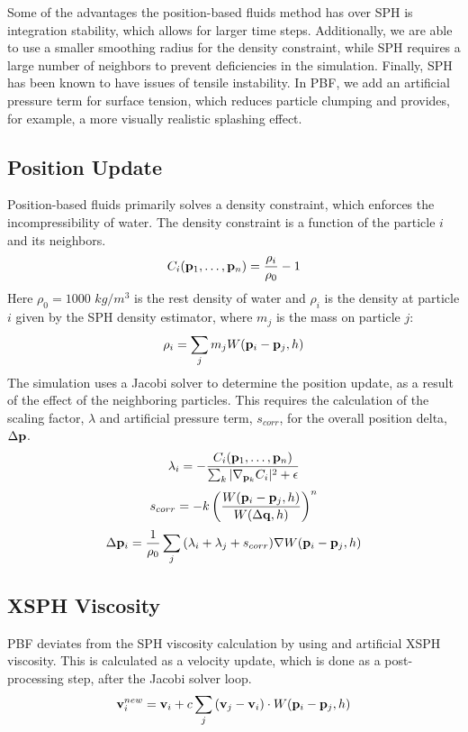 \documentclass[conference]{IEEEtran}
\begin{document}
Some of the advantages the position-based fluids method has over SPH is integration stability, which allows for larger time steps. Additionally, we are able to use a smaller smoothing radius for the density constraint, while SPH requires a large number of neighbors to prevent deficiencies in the simulation. Finally, SPH has been known to have issues of tensile instability. In PBF, we add an artificial pressure term for surface tension, which reduces particle clumping and provides, for example, a more visually realistic splashing effect. 
\subsection*{Position Update}
Position-based fluids primarily solves a density constraint, which enforces the incompressibility of water. The density constraint is a function of the particle $i$ and its neighbors. 
\begin{equation*} 
C_i(\bold p_1, \dots, \bold p_n) = \frac{\rho_i}{\rho_0} - 1
\end{equation*}
Here $\rho_0 = 1000$ $kg/m^3$ is the rest density of water and $\rho_i$ is the density at particle $i$ given by the SPH density estimator, where $m_j$ is the mass on particle $j$:
\begin{equation*} 
\rho_i = \sum_{j}{m_j W(\bold p_i-\bold p_j,h)}
\end{equation*} 
The simulation uses a Jacobi solver to determine the position update, as a result of the effect of the neighboring particles. This requires the calculation of the scaling factor, $\lambda$ and artificial pressure term, $s_{corr}$, for the overall position delta, $\Delta \bold p$.
\begin{equation*}
\lambda_i = -\frac{C_i(\bold p_1, \dots, \bold p_n)}{\sum_{k}{|\nabla_{\bold p_k}C_i|^2+\epsilon}}
\end{equation*}
\begin{equation*}
s_{corr} = -k\left(\frac{W(\bold p_i-\bold p_j, h)}{W(\Delta \bold q, h)}\right)^n
\end{equation*}
\begin{equation*}
\Delta \bold p_i = \frac{1}{\rho_0}\sum_{j}{(\lambda_i+\lambda_j+s_{corr})\nabla W(\bold p_i-\bold p_j, h)}
\end{equation*}
\subsection*{XSPH Viscosity}
PBF deviates from the SPH viscosity calculation by using and artificial XSPH viscosity. This is calculated as a velocity update, which is done as a post-processing step, after the Jacobi solver loop. 
\begin{equation*}
\bold v_i^{new} = \bold v_i+c\sum_j{(\bold v_j-\bold v_i)\cdot W(\bold p_i-\bold p_j, h)}
\end{equation*}
\end{document}
